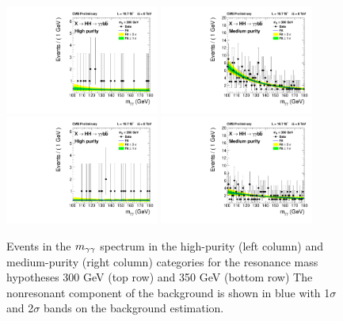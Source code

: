 \begin{figure}[ht]
 \begin{center}
   \includegraphics[width=0.45\textwidth]{figures/results/databkgoversig_cat0_300GeV.pdf}
   \includegraphics[width=0.45\textwidth]{figures/results/databkgoversig_cat1_300GeV.pdf}
   \includegraphics[width=0.45\textwidth]{figures/results/databkgoversig_cat0_350GeV.pdf}
   \includegraphics[width=0.45\textwidth]{figures/results/databkgoversig_cat1_350GeV.pdf}
 \end{center}
\caption{Events in the $m_{\gamma\gamma}$ spectrum in the high-purity (left column) and medium-purity
(right column) categories for the resonance mass hypotheses 300 GeV (top row) and 350 GeV (bottom row)
The nonresonant component of the background is shown in blue
with 1$\sigma$ and 2$\sigma$ bands on the background estimation.}
\label{fig:datafit_300}
\end{figure}

